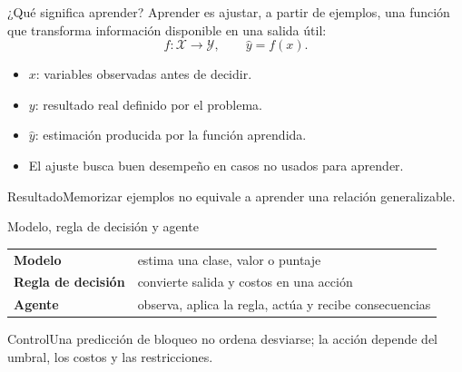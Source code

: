 \documentclass[aspectratio=169,10pt]{beamer}
\newcommand{\br}{\\}
\begin{document}
\begin{frame}{¿Qué significa aprender?}
  \small Aprender es ajustar, a partir de ejemplos, una función que transforma información disponible en una salida útil:
  \[f:\mathcal{X}\rightarrow\mathcal{Y},\qquad \hat y=f(x).\]
  \begin{itemize}
    \item $x$: variables observadas antes de decidir. \item $y$: resultado real definido por el problema.
    \item $\hat y$: estimación producida por la función aprendida.
    \item El ajuste busca buen desempeño en casos no usados para aprender.
  \end{itemize}
  \begin{block}{Resultado}Memorizar ejemplos no equivale a aprender una relación generalizable.\end{block}
\end{frame}

\begin{frame}{Modelo, regla de decisión y agente}
  \small
  \centering
  \begin{tabularx}{\textwidth}{>{\bfseries}p{}X}\toprule
  Modelo & estima una clase, valor o puntaje\\ Regla de decisión & convierte salida y costos en una acción\\ Agente & observa, aplica la regla, actúa y recibe consecuencias\\\bottomrule\end{tabularx}
  \begin{alertblock}{Control}Una predicción de bloqueo no ordena desviarse; la acción depende del umbral, los costos y las restricciones.\end{alertblock}
\end{frame}
\end{document}
